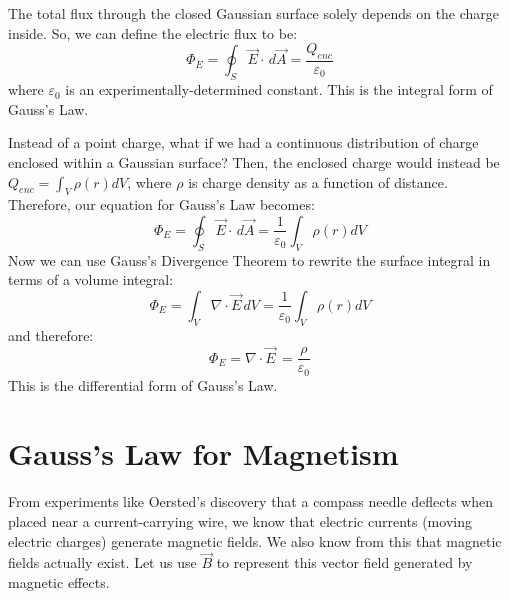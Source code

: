 \documentclass{article}
\begin{document}
\vspace{5em}

The total flux through the closed Gaussian surface solely depends on the charge inside. So, we can define the electric flux to be:
\begin{equation}
\boxed{\Phi_E = \oint_{S} \vec E \cdot \, d\vec A = \frac{Q_{enc}}{\varepsilon_0}}
\end{equation}
where $\varepsilon_0$ is an experimentally-determined constant. This is the integral form of Gauss's Law.

\vspace{1em}

Instead of a point charge, what if we had a continuous distribution of charge enclosed within a Gaussian surface? Then, the enclosed charge would instead be $Q_{enc} = \int_{V} \rho(r) dV$, where $\rho$ is charge density as a function of distance. Therefore, our equation for Gauss's Law becomes:
\begin{equation}
\Phi_E = \oint_{S} \vec E \cdot \, d\vec A = \frac{1}{\varepsilon_0}\int_{V} \rho(r) dV
\end{equation}
Now we can use Gauss's Divergence Theorem to rewrite the surface integral in terms of a volume integral:
\begin{equation}
\Phi_E = \int_{V} \nabla \cdot \vec E \, dV = \frac{1}{\varepsilon_0}\int_{V} \rho(r) dV
\end{equation}
and therefore:
\begin{equation}
\boxed{\Phi_E = \nabla \cdot \vec E \, = \frac{\rho}{\varepsilon_0}}
\end{equation}
This is the differential form of Gauss's Law.

\pagebreak
\section{Gauss's Law for Magnetism}

From experiments like Oersted's discovery that a compass needle deflects when placed near a current-carrying wire, we know that electric currents (moving electric charges) generate magnetic fields. We also know from this that magnetic fields actually exist. Let us use $\vec B$ to represent this vector field generated by magnetic effects.
\end{document}
